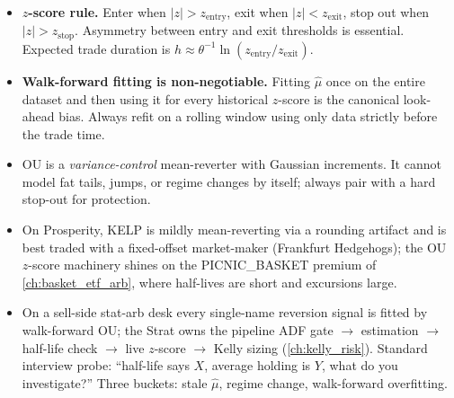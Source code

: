 \begin{itemize}
  \item \textbf{$z$-score rule.} Enter when $|z| > z_{\text{entry}}$,
  exit when $|z| < z_{\text{exit}}$, stop out when
  $|z| > z_{\text{stop}}$. Asymmetry between entry and exit
  thresholds is essential. Expected trade duration is
  $h \approx \theta^{-1}\ln(z_{\text{entry}}/z_{\text{exit}})$.
  \item \textbf{Walk-forward fitting is non-negotiable.} Fitting
  $\hat\mu$ once on the entire dataset and then using it for
  every historical $z$-score is the canonical look-ahead bias.
  Always refit on a rolling window using only data strictly
  before the trade time.
  \item OU is a \emph{variance-control} mean-reverter with
  Gaussian increments. It cannot model fat tails, jumps, or
  regime changes by itself; always pair with a hard stop-out
  for protection.
  \item On Prosperity, KELP is mildly mean-reverting via a
  rounding artifact and is best traded with a fixed-offset
  market-maker (Frankfurt Hedgehogs); the OU $z$-score
  machinery shines on the PICNIC\_BASKET premium of
  \cref{ch:basket_etf_arb}, where half-lives are short and
  excursions large.
  \item On a sell-side stat-arb desk every single-name
  reversion signal is fitted by walk-forward OU; the Strat owns
  the pipeline ADF gate $\to$ estimation $\to$ half-life check
  $\to$ live $z$-score $\to$ Kelly sizing
  (\cref{ch:kelly_risk}). Standard interview probe:
  ``half-life says $X$, average holding is $Y$, what do you
  investigate?'' Three buckets: stale $\hat\mu$, regime
  change, walk-forward overfitting.
\end{itemize}

